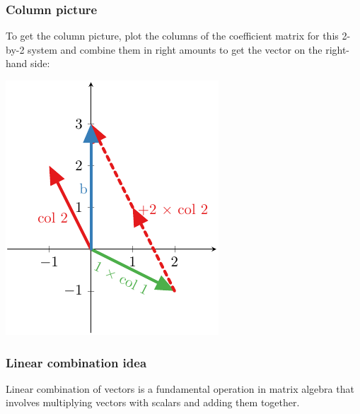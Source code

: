 \documentclass[../main.tex]{subfiles}
\begin{document}
\subsubsection{Column picture}
To get the column picture, plot the columns of the coefficient matrix for this 2-by-2 system and combine them in right amounts to get the vector on the right-hand side:

\begingroup
\centering
\includegraphics[width = 0.5\columnwidth]{../figures/fig02_2d-col-pic/figure.pdf}
\par
\endgroup

\subsubsection{Linear combination idea}
Linear combination of vectors is a fundamental operation in matrix algebra that involves multiplying vectors with scalars and adding them together. \\
\end{document}
